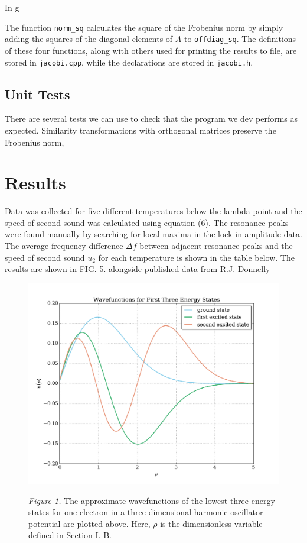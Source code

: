 \documentclass[prb,aps,twocolumn,showpacs,10pt]{revtex4-1}
\begin{document}
In g

The function \texttt{norm\_sq} calculates the square of the Frobenius norm by simply adding the squares of the diagonal elements of $A$ to \texttt{offdiag\_sq}. The definitions of these four functions, along with others used for printing the results to file, are stored in \texttt{jacobi.cpp}, while the declarations are stored in \texttt{jacobi.h}. 

\subsection{Unit Tests}

There are several tests we can use to check that the program we dev performs as expected. 
Similarity transformations with orthogonal matrices preserve the Frobenius norm,

\section{Results}

Data was collected for five different temperatures below the lambda point and the speed of second sound was calculated using equation (6). The resonance peaks were found manually by searching for local maxima in the lock-in amplitude data. The average frequency difference $\Delta f$ between adjacent resonance peaks and the speed of second sound $u_2$ for each temperature is shown in the table below. The results are shown in FIG. 5. alongside published data from R.J. Donnelly \cite{donnelly.} 

\begin{center}
\begin{figure}
\includegraphics[scale=0.7]{wvfunc_1e.pdf}

\textit{Figure 1.} The approximate wavefunctions of the lowest three energy states for one electron in a three-dimensional harmonic oscillator potential are plotted above. Here, $\rho$ is the dimensionless variable defined in Section I. B. 
\end{figure}
\end{center}
\end{document}
